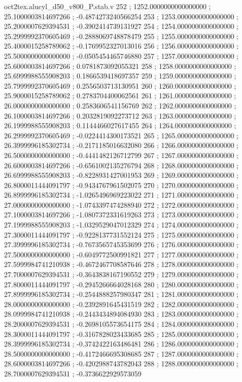 \begin{filecontents}[overwrite]{oct2tex.alucyl_d50_v800_P.stab.v}
252 ; 1252.0000000000000000 ; 25.1000003814697266 ; -0.4874273240566254
253 ; 1253.0000000000000000 ; 25.2000007629394531 ; -0.3902414739131927
254 ; 1254.0000000000000000 ; 25.2999992370605469 ; -0.2888069748878479
255 ; 1255.0000000000000000 ; 25.4000015258789062 ; -0.1769952327013016
256 ; 1256.0000000000000000 ; 25.5000000000000000 ; -0.0505454465746880
257 ; 1257.0000000000000000 ; 25.6000003814697266 ; 0.0781873092055321
258 ; 1258.0000000000000000 ; 25.6999988555908203 ; 0.1866539418697357
259 ; 1259.0000000000000000 ; 25.7999992370605469 ; 0.2556503713130951
260 ; 1260.0000000000000000 ; 25.9000015258789062 ; 0.2783704400062561
261 ; 1261.0000000000000000 ; 26.0000000000000000 ; 0.2583606541156769
262 ; 1262.0000000000000000 ; 26.1000003814697266 ; 0.2032819092273712
263 ; 1263.0000000000000000 ; 26.1999988555908203 ; 0.1144466027617455
264 ; 1264.0000000000000000 ; 26.2999992370605469 ; -0.0224414300173521
265 ; 1265.0000000000000000 ; 26.3999996185302734 ; -0.2171185016632080
266 ; 1266.0000000000000000 ; 26.5000000000000000 ; -0.4441482126712799
267 ; 1267.0000000000000000 ; 26.6000003814697266 ; -0.6561002135276794
268 ; 1268.0000000000000000 ; 26.6999988555908203 ; -0.8228931427001953
269 ; 1269.0000000000000000 ; 26.8000011444091797 ; -0.9434767961502075
270 ; 1270.0000000000000000 ; 26.8999996185302734 ; -1.0265496969223022
271 ; 1271.0000000000000000 ; 27.0000000000000000 ; -1.0743397474288940
272 ; 1272.0000000000000000 ; 27.1000003814697266 ; -1.0807372331619263
273 ; 1273.0000000000000000 ; 27.1999988555908203 ; -1.0329529047012329
274 ; 1274.0000000000000000 ; 27.3000011444091797 ; -0.9228137731552124
275 ; 1275.0000000000000000 ; 27.3999996185302734 ; -0.7673565745353699
276 ; 1276.0000000000000000 ; 27.5000000000000000 ; -0.6049772500991821
277 ; 1277.0000000000000000 ; 27.5999984741210938 ; -0.4672467708587646
278 ; 1278.0000000000000000 ; 27.7000007629394531 ; -0.3643838167190552
279 ; 1279.0000000000000000 ; 27.8000011444091797 ; -0.2945266664028168
280 ; 1280.0000000000000000 ; 27.8999996185302734 ; -0.2544888257980347
281 ; 1281.0000000000000000 ; 28.0000000000000000 ; -0.2392891645431519
282 ; 1282.0000000000000000 ; 28.0999984741210938 ; -0.2443434894084930
283 ; 1283.0000000000000000 ; 28.2000007629394531 ; -0.2698105573654175
284 ; 1284.0000000000000000 ; 28.3000011444091797 ; -0.3167828023433685
285 ; 1285.0000000000000000 ; 28.3999996185302734 ; -0.3742422163486481
286 ; 1286.0000000000000000 ; 28.5000000000000000 ; -0.4172466695308685
287 ; 1287.0000000000000000 ; 28.6000003814697266 ; -0.4202988743782043
288 ; 1288.0000000000000000 ; 28.7000007629394531 ; -0.3736622929573059

\end{filecontents}
